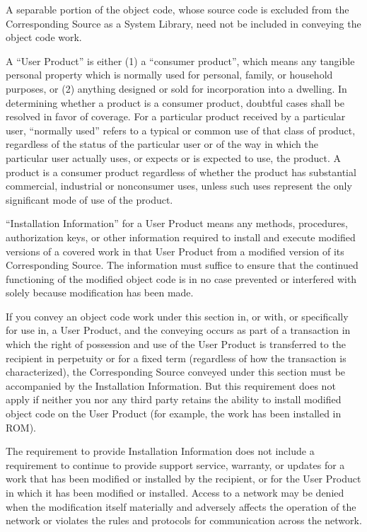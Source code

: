 \documentclass[letterpaper,10pt,english]{sphinxmanual}
\begin{document}
\sphinxAtStartPar
A separable portion of the object code, whose source code is excluded from the Corresponding Source as a System Library, need not be included in conveying the object code work.

\sphinxAtStartPar
A “User Product” is either (1) a “consumer product”, which means any tangible personal property which is normally used for personal, family, or household purposes, or (2) anything designed or sold for incorporation into a dwelling. In determining whether a product is a consumer product, doubtful cases shall be resolved in favor of coverage. For a particular product received by a particular user, “normally used” refers to a typical or common use of that class of product, regardless of the status of the particular user or of the way in which the particular user actually uses, or expects or is expected to use, the product. A product is a consumer product regardless of whether the product has substantial commercial, industrial or non\sphinxhyphen{}consumer uses, unless such uses represent the only significant mode of use of the product.

\sphinxAtStartPar
“Installation Information” for a User Product means any methods, procedures, authorization keys, or other information required to install and execute modified versions of a covered work in that User Product from a modified version of its Corresponding Source. The information must suffice to ensure that the continued functioning of the modified object code is in no case prevented or interfered with solely because modification has been made.

\sphinxAtStartPar
If you convey an object code work under this section in, or with, or specifically for use in, a User Product, and the conveying occurs as part of a transaction in which the right of possession and use of the User Product is transferred to the recipient in perpetuity or for a fixed term (regardless of how the transaction is characterized), the Corresponding Source conveyed under this section must be accompanied by the Installation Information. But this requirement does not apply if neither you nor any third party retains the ability to install modified object code on the User Product (for example, the work has been installed in ROM).

\sphinxAtStartPar
The requirement to provide Installation Information does not include a requirement to continue to provide support service, warranty, or updates for a work that has been modified or installed by the recipient, or for the User Product in which it has been modified or installed. Access to a network may be denied when the modification itself materially and adversely affects the operation of the network or violates the rules and protocols for communication across the network.
\end{document}
